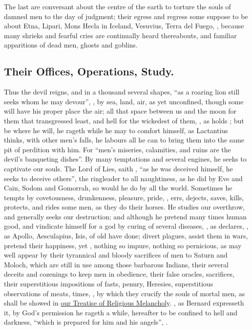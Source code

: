 The last are conversant about the centre of the earth to torture the souls of
damned men to the day of judgment; their egress and regress some suppose to be
about Etna, Lipari, Mons Hecla in Iceland, Vesuvius, Terra del Fuego, \etc{},
because many shrieks and fearful cries are continually heard thereabouts, and
familiar apparitions of dead men, ghosts and goblins.

\subsection{Their Offices, Operations, Study.}
Thus the devil reigns, and in a thousand several shapes, \enquote{as a roaring lion
still seeks whom he may devour}, , by sea, land, air,
as yet unconfined, though some will have his proper place
the air; all that space between us and the moon for them that transgressed
least, and hell for the wickedest of them, , as \Austin{} holds
; but be
where he will, he rageth while he may to comfort himself, as
Lactantius thinks, with other men's falls, he labours all
he can to bring them into the same pit of perdition with him. For
\enquote{men's miseries, calamities, and ruins are the devil's
banqueting dishes}. By many temptations and several engines, he seeks to
captivate our souls. The Lord of Lies, saith \Austin{}, \enquote{as
he was deceived himself, he seeks to deceive others}, the ringleader to all
naughtiness, as he did by Eve and Cain, Sodom and Gomorrah, so would he do by
all the world. Sometimes he tempts by covetousness, drunkenness, pleasure,
pride, \etc{}, errs, dejects, saves, kills, protects, and rides some men, as
they do their horses. He studies our overthrow, and generally seeks our
destruction; and although he pretend many times human good, and vindicate
himself for a god by curing of several diseases, , as \Austin{} declares, , as Apollo, Aesculapius, Isis, of old have done;
divert plagues, assist them in wars, pretend their happiness, yet , nothing so impure,
nothing so pernicious, as may well appear by their tyrannical and bloody
sacrifices of men to Saturn and Moloch, which are still in use among those
barbarous Indians, their several deceits and cozenings to keep men in
obedience, their false oracles, sacrifices, their superstitious impositions of
fasts, penury, \etc{} Heresies, superstitious observations of meats, times,
\etc{}, by which they crucify the souls of mortal men, as
shall be showed in \hyperref[ch:religious-melancholy]{our Treatise of
Religious Melancholy}. , as
Bernard expresseth it, by God's permission he rageth a
while, hereafter to be confined to hell and darkness, \enquote{which is prepared for
him and his angels}, .

